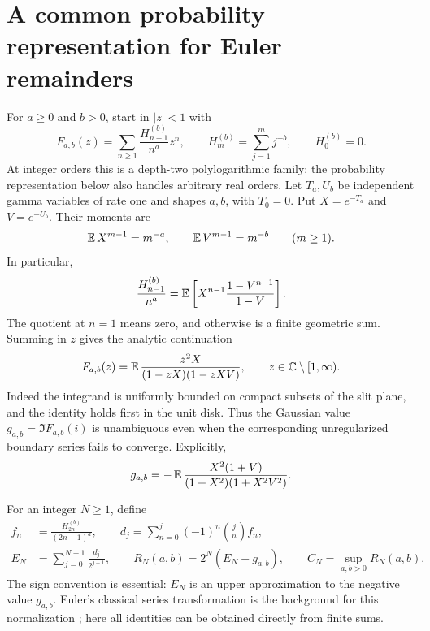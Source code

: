 \section{A common probability representation for Euler remainders}
\label{sec:setup}

For $a\geq0$ and $b>0$, start in $|z|<1$ with
\begin{equation}\label{eq:polylog-definition}
 F_{a,b}(z)=\sum_{n\geq1}\frac{H_{n-1}^{(b)}}{n^a}z^n,
 \qquad H_m^{(b)}=\sum_{j=1}^m j^{-b},\qquad H_0^{(b)}=0.
\end{equation}
At integer orders this is a depth-two polylogarithmic family; the
probability representation below also handles arbitrary real orders.
Let $T_a,U_b$ be independent gamma variables of rate one and shapes
$a,b$, with $T_0=0$. Put $X=e^{-T_a}$ and $V=e^{-U_b}$. Their moments are
\[
 \operatorname{\mathbb E} X^{m-1}=m^{-a},\qquad \operatorname{\mathbb E} V^{m-1}=m^{-b}\qquad(m\geq1).
\]
In particular,
\begin{equation}\label{eq:moment-law}
 \frac{H_{n-1}^{(b)}}{n^a}
    =\operatorname{\mathbb E}\left[X^{n-1}\frac{1-V^{n-1}}{1-V}\right].
\end{equation}
The quotient at $n=1$ means zero, and otherwise is a finite geometric
sum. Summing in $z$ gives the analytic continuation
\begin{equation}\label{eq:polylog-continuation}
 F_{a,b}(z)=\operatorname{\mathbb E}\frac{z^2X}{(1-zX)(1-zXV)},
 \qquad z\in\mathbb C\setminus[1,\infty).
\end{equation}
Indeed the integrand is uniformly bounded on compact subsets of the
slit plane, and the identity holds first in the unit disk. Thus the
Gaussian value $g_{a,b}=\Im F_{a,b}(i)$ is unambiguous even when the
corresponding unregularized boundary series fails to converge. Explicitly,
\begin{equation}\label{eq:gaussian-value}
 g_{a,b}=-\operatorname{\mathbb E}\frac{X^2(1+V)}{(1+X^2)(1+X^2V^2)}.
\end{equation}

For an integer $N\geq1$, define
\begin{align}
 f_n&=\frac{H_{2n}^{(b)}}{(2n+1)^a},\qquad
 d_j=\sum_{n=0}^j(-1)^n\binom jn f_n,
 \label{eq:euler-differences}\\
 E_N&=\sum_{j=0}^{N-1}\frac{d_j}{2^{j+1}},\qquad
 R_N(a,b)=2^N(E_N-g_{a,b}),\qquad
 C_N=\sup_{a,b>0}R_N(a,b).
 \label{eq:euler-normalization}
\end{align}
The sign convention is essential: $E_N$ is an upper approximation to
the negative value $g_{a,b}$. Euler's classical series transformation is
the background for this normalization \cite{DLMFEuler}; here all
identities can be obtained directly from finite sums.

